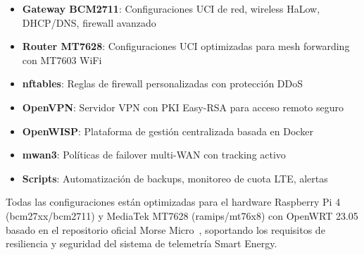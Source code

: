 \begin{itemize}
    \item \textbf{Gateway BCM2711}: Configuraciones UCI de red, wireless HaLow, DHCP/DNS, firewall avanzado
    \item \textbf{Router MT7628}: Configuraciones UCI optimizadas para mesh forwarding con MT7603 WiFi
    \item \textbf{nftables}: Reglas de firewall personalizadas con protección DDoS
    \item \textbf{OpenVPN}: Servidor VPN con PKI Easy-RSA para acceso remoto seguro
    \item \textbf{OpenWISP}: Plataforma de gestión centralizada basada en Docker
    \item \textbf{mwan3}: Políticas de failover multi-WAN con tracking activo
    \item \textbf{Scripts}: Automatización de backups, monitoreo de cuota LTE, alertas
\end{itemize}

Todas las configuraciones están optimizadas para el hardware Raspberry Pi 4 (bcm27xx/bcm2711) y MediaTek MT7628 (ramips/mt76x8) con OpenWRT 23.05 basado en el repositorio oficial Morse Micro~\cite{morsemicroOpenWRT2024}, soportando los requisitos de resiliencia y seguridad del sistema de telemetría Smart Energy.

